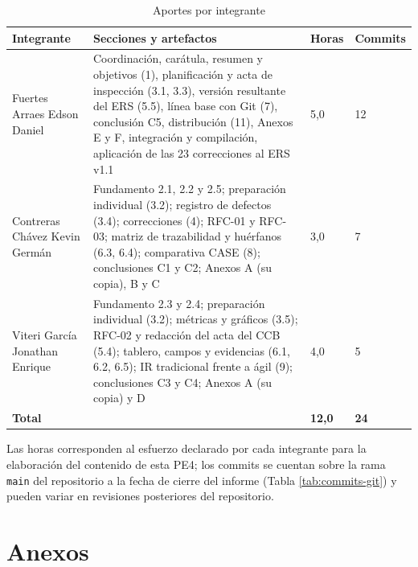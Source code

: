 \documentclass[journal,onecolumn]{IEEEtran}
\begin{document}
	\begin{table}[H]
		\centering
		\caption{Aportes por integrante}
		\label{tab:distribucion}
		\begin{tabular}{L{3.8cm} L{6.0cm} L{1.6cm} L{1.6cm}}
			\toprule
			\textbf{Integrante} & \textbf{Secciones y artefactos} & \textbf{Horas} &
			\textbf{Commits} \\
			\midrule
			Fuertes Arraes Edson Daniel &
			Coordinación, carátula, resumen y objetivos (1), planificación y acta de inspección
			(3.1, 3.3), versión resultante del ERS (5.5), línea base con Git (7), conclusión C5,
			distribución (11), Anexos E y F, integración y compilación, aplicación de las 23
			correcciones al ERS v1.1 & 5,0 & 12 \\
			\addlinespace
			Contreras Chávez Kevin Germán &
			Fundamento 2.1, 2.2 y 2.5; preparación individual (3.2); registro de defectos (3.4);
			correcciones (4); RFC-01 y RFC-03; matriz de trazabilidad y huérfanos (6.3, 6.4);
			comparativa CASE (8); conclusiones C1 y C2; Anexos A (su copia), B y C & 3,0 & 7 \\
			\addlinespace
			Viteri García Jonathan Enrique &
			Fundamento 2.3 y 2.4; preparación individual (3.2); métricas y gráficos (3.5);
			RFC-02 y redacción del acta del CCB (5.4); tablero, campos y evidencias
			(6.1, 6.2, 6.5); IR tradicional frente a ágil (9); conclusiones C3 y C4;
			Anexos A (su copia) y D & 4,0 & 5 \\
			\midrule
			\textbf{Total} & & \textbf{12,0} & \textbf{24} \\
			\bottomrule
		\end{tabular}
	\end{table}
	
	Las horas corresponden al esfuerzo declarado por cada integrante para la elaboración del
	contenido de esta PE4; los commits se cuentan sobre la rama \texttt{main} del repositorio a la
	fecha de cierre del informe (Tabla \ref{tab:commits-git}) y pueden variar en revisiones
	posteriores del repositorio.
	
	\newpage
	\printbibliography[title={Referencias}]
	
	\newpage
	\appendix
	\section*{Anexos}
	
\end{document}
